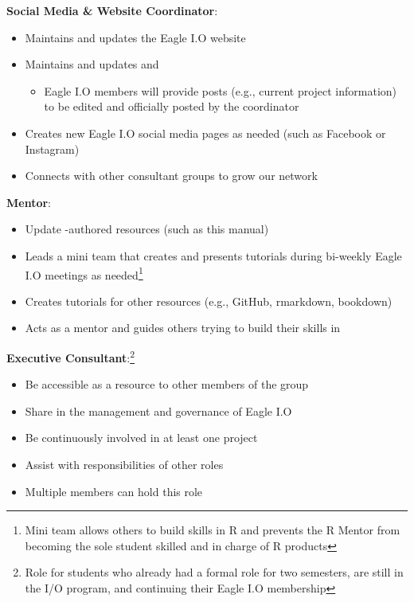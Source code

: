 \documentclass[
]{book}
\providecommand{\tightlist}{%
  \setlength{\itemsep}{0pt}\setlength{\parskip}{0pt}}
\begin{document}
\textbf{Social Media \& Website Coordinator}:

\begin{itemize}
\tightlist
\item
  Maintains and updates the Eagle I.O website
\item
  Maintains and updates \href{https://www.linkedin.com/company/eagle-i-o/}{} and \href{https://www.instagram.com/eagle_i.o/}{}

  \begin{itemize}
  \tightlist
  \item
    Eagle I.O members will provide posts (e.g., current project information) to be edited and officially posted by the coordinator
  \end{itemize}
\item
  Creates new Eagle I.O social media pages as needed (such as Facebook or Instagram)
\item
  Connects with other consultant groups to grow our network
\end{itemize}

\textbf{ Mentor}:

\begin{itemize}
\tightlist
\item
  Update -authored resources (such as this manual)
\item
  Leads a mini team that creates and presents tutorials during bi-weekly Eagle I.O meetings as needed\footnote{Mini team allows others to build skills in R and prevents the R Mentor from becoming the sole student skilled and in charge of R products}\\
\item
  Creates tutorials for other resources (e.g., GitHub, rmarkdown, bookdown)\\
\item
  Acts as a mentor and guides others trying to build their skills in
\end{itemize}

\textbf{Executive Consultant}:\footnote{Role for students who already had a formal role for two semesters, are still in the I/O program, and continuing their Eagle I.O membership}

\begin{itemize}
\tightlist
\item
  Be accessible as a resource to other members of the group
\item
  Share in the management and governance of Eagle I.O
\item
  Be continuously involved in at least one project
\item
  Assist with responsibilities of other roles\\
\item
  Multiple members can hold this role
\end{itemize}
\end{document}
